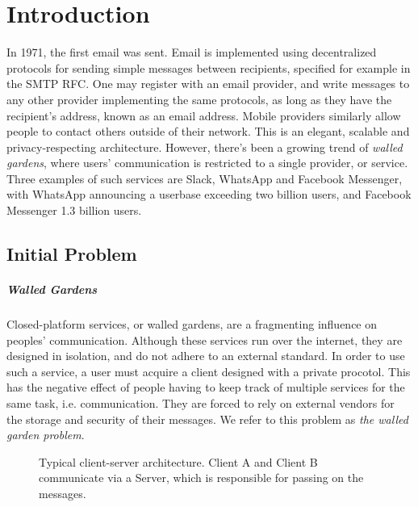 \chapter{Introduction}
In 1971, the first email was sent\cite{tomlinson2009first}.
Email is implemented using decentralized protocols for sending simple messages between recipients, specified for example in the \ac{SMTP} \ac{RFC}\cite{RFC5321}.
One may register with an email provider, and write messages to any other provider implementing the same protocols, as long as they have the recipient's address, known as an email address.
Mobile providers similarly allow people to contact others outside of their network.
This is an elegant, scalable and privacy-respecting architecture.
However, there's been a growing trend of \textit{walled gardens}\cite{walled_gardens_gunnar_wolf_acm_2018}, where users' communication is restricted to a single provider, or service.
Three examples of such services are Slack, WhatsApp and Facebook Messenger, with WhatsApp announcing a userbase exceeding two billion users, and Facebook Messenger 1.3 billion users\cite{walled_gardens_gunnar_wolf_acm_2018,whatsapp_2b_users_archive_org,messenger_1pt3b_users}.

\section{Initial Problem}\label{subsec:initial_problem_statement}
\paragraph{Walled Gardens}
Closed-platform services, or walled gardens, are a fragmenting influence on peoples' communication.
Although these services run over the internet, they are designed in isolation, and do not adhere to an external standard.
In order to use such a service, a user must acquire a client designed with a private procotol.
This has the negative effect of people having to keep track of multiple services for the same task, i.e. communication.
They are forced to rely on external vendors for the storage and security of their messages.
We refer to this problem as \textit{the walled garden problem}.

\begin{figure}
    \centering
    \resizebox{0.6\linewidth}{!}{}
    \caption{
        Typical client-server architecture.
        Client A and Client B communicate via a Server, which is responsible for passing on the messages.
    }
    \label{fig:client_server}
\end{figure}


